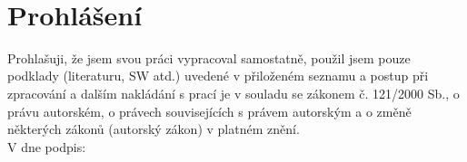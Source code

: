 \setcounter{page}{1}
\thispagestyle{empty}

\newpage


~\\[15cm]
\section*{Prohlášení}

Prohlašuji, že jsem svou práci vypracoval samostatně, použil jsem pouze
podklady (literaturu, SW atd.) uvedené v přiloženém seznamu a postup při
zpracování a dalším nakládání s prací je v souladu se zákonem č. 121/2000 Sb.,
o právu autorském, o právech souvisejících s právem autorským a o změně
některých zákonů (autorský zákon) v platném znění.\\[0.7cm]

V \makebox[3cm]{\dotfill} dne \makebox[4cm]{\dotfill}
podpis: \makebox[6cm]{\dotfill}

\newpage

~

\newpage
